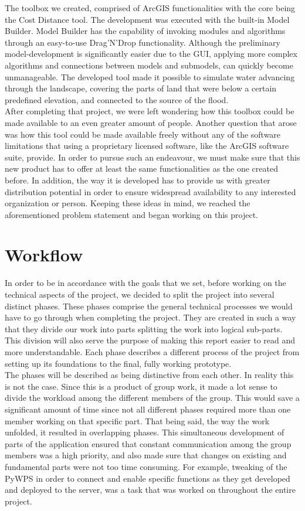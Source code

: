 The toolbox we created, comprised of ArcGIS functionalities with the core being the Cost Distance tool. The development was executed with the built-in Model Builder. Model Builder has the capability of invoking modules and algorithms through an easy-to-use Drag'N'Drop functionality. Although the preliminary model-development is significantly easier due to the GUI, applying more complex algorithms and connections between models and submodels, can quickly become unmanageable. 
The developed tool made it possible to simulate water advancing through the landscape, covering the parts of land that were below a certain predefined elevation, and connected to the source of the flood. \\

After completing that project, we were left wondering how this toolbox could be made available to an even greater amount of people. Another question that arose was how this tool could be made available freely without any of the software limitations that using a proprietary licensed software, like the ArcGIS software suite, provide.
In order to pursue such an endeavour, we must make sure that this new product has to offer at least the same functionalities as the one created before. In addition, the way it is developed has to provide us with greater distribution potential in order to ensure widespread availability to any interested organization or person. Keeping these ideas in mind, we reached the aforementioned problem statement and began working on this project.

\section{Workflow}
In order to be in accordance with the goals that we set, before working on the technical aspects of the project, we decided to split the project into several distinct phases. These phases comprise the general technical processes we would have to go through when completing the project. They are created in such a way that they divide our work into parts splitting the work into logical sub-parts. This division will also serve the purpose of making this report easier to read and more understandable.   
Each phase describes a different process of the project from setting up its foundations to the final, fully working prototype. \\
The phases will be described as being distinctive from each other. In reality this is not the case. Since this is a product of group work, it made a lot sense to divide the workload among the different members of the group. This would save a significant amount of time since not all different phases required more than one member working on that specific part. That being said, the way the work unfolded, it resulted in overlapping phases. This simultaneous development of parts of the application ensured that constant communication among the group members was a high priority, and also made sure that changes on existing and fundamental parts were not too time consuming. For example, tweaking of the PyWPS  in order to connect and enable specific functions as they get developed and deployed to the server, was a task that was worked on throughout the entire project.\\

